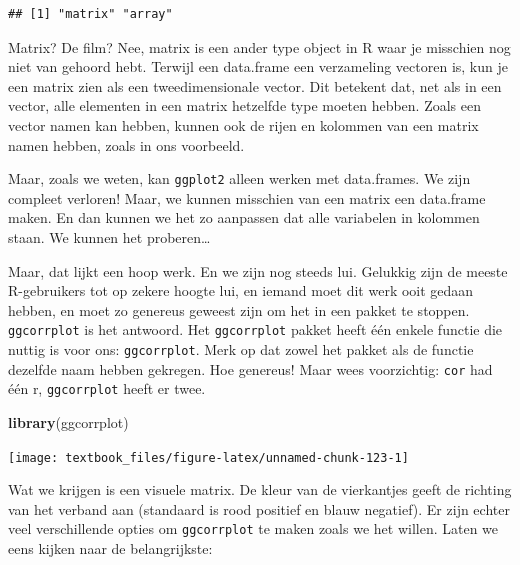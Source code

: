 \documentclass[]{tufte-book}
\newenvironment{Shaded}{}{}
\newcommand{\KeywordTok}[1]{\textcolor[rgb]{0.00,0.44,0.13}{\textbf{#1}}}
\newcommand{\NormalTok}[1]{#1}
\newcommand{\OperatorTok}[1]{\textcolor[rgb]{0.40,0.40,0.40}{#1}}
\newcommand{\StringTok}[1]{\textcolor[rgb]{0.25,0.44,0.63}{#1}}
\begin{document}
\begin{verbatim}
## [1] "matrix" "array"
\end{verbatim}

Matrix? De film? Nee, matrix is een ander type object in R waar je misschien nog niet van gehoord hebt. Terwijl een data.frame een verzameling vectoren is, kun je een matrix zien als een tweedimensionale vector. Dit betekent dat, net als in een vector, alle elementen in een matrix hetzelfde type moeten hebben. Zoals een vector namen kan hebben, kunnen ook de rijen en kolommen van een matrix namen hebben, zoals in ons voorbeeld.

Maar, zoals we weten, kan \texttt{ggplot2} alleen werken met data.frames. We zijn compleet verloren! Maar, we kunnen misschien van een matrix een data.frame maken. En dan kunnen we het zo aanpassen dat alle variabelen in kolommen staan. We kunnen het proberen\ldots{}

Maar, dat lijkt een hoop werk. En we zijn nog steeds lui. Gelukkig zijn de meeste R-gebruikers tot op zekere hoogte lui, en iemand moet dit werk ooit gedaan hebben, en moet zo genereus geweest zijn om het in een pakket te stoppen. \texttt{ggcorrplot} is het antwoord. Het \texttt{ggcorrplot} pakket heeft één enkele functie die nuttig is voor ons: \texttt{ggcorrplot}. Merk op dat zowel het pakket als de functie dezelfde naam hebben gekregen. Hoe genereus! Maar wees voorzichtig: \texttt{cor} had één r, \texttt{ggcorrplot} heeft er twee.

\begin{Shaded}
\begin{Highlighting}[]
\KeywordTok{library}\NormalTok{(ggcorrplot)}
\end{Highlighting}
\end{Shaded}

\begin{Shaded}
\end{Shaded}

\texttt{[image: textbook\_files/figure-latex/unnamed-chunk-123-1]}

Wat we krijgen is een visuele matrix. De kleur van de vierkantjes geeft de richting van het verband aan (standaard is rood positief en blauw negatief). Er zijn echter veel verschillende opties om \texttt{ggcorrplot} te maken zoals we het willen. Laten we eens kijken naar de belangrijkste:
\end{document}
